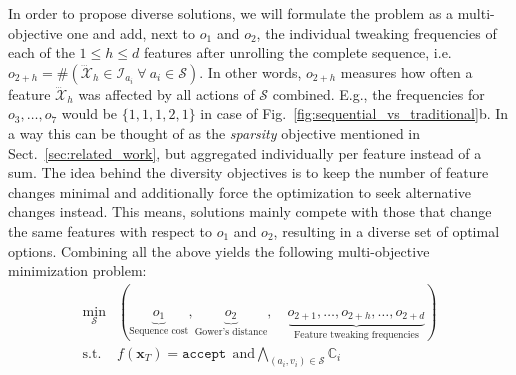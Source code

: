 \documentclass[runningheads, envcountsame, a4paper]{llncs}
\newcommand{\action}{a}
\newcommand{\Value}{v}
\newcommand{\state}{\mathbf{x}}
\newcommand{\targetclass}{\texttt{accept}}
\newcommand{\featurespace}{\mathcal{X}}
\newcommand{\feature}{\dddot{\featurespace}}
\newcommand{\featureindex}{\mathcal{I}}
\newcommand{\constraint}{\mathbb{C}}
\newcommand{\sequence}{\mathcal{S}}
\newcommand{\objective}{o}
\newcommand{\seqCosts}{\objective_{1}}
\newcommand{\seqDistance}{\objective_{2}}
\newcommand{\blackbox}{f}
\newcommand{\finalsolution}{\state_{T}}
\begin{document}
In order to propose diverse solutions, we will formulate the problem as a multi-objective one and add, next to $\seqCosts$ and $\seqDistance$, the individual tweaking frequencies of each of the $1 \leq h \leq d$ features after unrolling the complete sequence, i.e. $\objective_{2+h} = \#(\feature_h \in \featureindex_{\action_i} \ \forall \ \action_i \in \sequence)$. In other words, $\objective_{2+h}$ measures how often a feature $\feature_h$ was affected by all actions of $\sequence$ combined. E.g., the frequencies for $\objective_3, \dots, \objective_7$ would be $\{1,1,1,2,1\}$ in case of Fig.~\ref{fig:sequential_vs_traditional}b.
In a way this can be thought of as the \emph{sparsity} objective mentioned in Sect.~\ref{sec:related_work}, but aggregated individually per feature instead of a sum.
The idea behind the diversity objectives is to keep the number of feature changes minimal and additionally force the optimization to seek alternative changes instead.
This means, solutions mainly compete with those that change the same features with respect to $\seqCosts$ and $\seqDistance$, resulting in a diverse set of optimal options.
Combining all the above yields the following multi-objective minimization problem:
\begin{equation}
    \begin{split}
	\min_{\sequence} & {(\underbrace{\seqCosts}_{\text{Sequence cost}}, \underbrace{\seqDistance}_{\text{Gower's distance}}, \quad \underbrace{\objective_{2+1}, \dots, \objective_{2+h} , \dots, \objective_{2+d}}_{\text{Feature tweaking frequencies}})} \\ \text{s.t.} \ & \blackbox(\finalsolution) = \targetclass \ \ \text{and} \bigwedge_{(\action_i, \Value_i) \in \sequence}{\constraint_i} \\
	\end{split}
	\label{eq:problem}
\end{equation}

\end{document}
